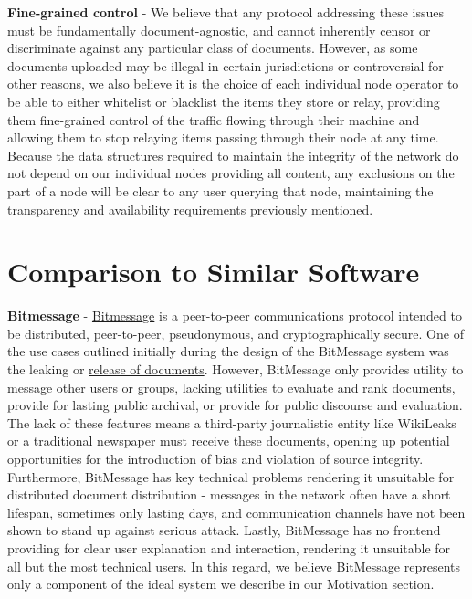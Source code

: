 \documentclass[letterpaper,10pt,oneside]{sphinxmanual}
\begin{document}
\textbf{Fine-grained control} - We believe that any protocol addressing these issues must be fundamentally document-agnostic, and
cannot inherently censor or discriminate against any particular class of documents.  However, as some documents uploaded may be
illegal in certain jurisdictions or controversial for other reasons, we also believe it is the choice of each individual node
operator to be able to either whitelist or blacklist the items they store or relay, providing them fine-grained control of the
traffic flowing through their machine and allowing them to stop relaying items passing through their node at any time.  Because
the data structures required to maintain the integrity of the network do not depend on our individual nodes providing all
content, any exclusions on the part of a node will be clear to any user querying that node, maintaining the transparency and
availability requirements previously mentioned.


\section{Comparison to Similar Software}
\label{design:comparison-to-similar-software}
\textbf{Bitmessage} - \href{http://bitmessage.org}{Bitmessage} is a peer-to-peer communications protocol intended to be distributed,
peer-to-peer, pseudonymous, and cryptographically secure.  One of the use cases outlined initially during the design of the
BitMessage system was the leaking or \href{https://bitmessage.org/forum/index.php?topic=3.0}{release of documents}.  However,
BitMessage only provides utility to message other users or groups, lacking utilities to evaluate and rank documents, provide for
lasting public archival, or provide for public discourse and evaluation.  The lack of these features means a third-party
journalistic entity like WikiLeaks or a traditional newspaper must receive these documents, opening up potential opportunities
for the introduction of bias and violation of source integrity.  Furthermore, BitMessage has key technical problems rendering it
unsuitable for distributed document distribution - messages in the network often have a short lifespan, sometimes only lasting
days, and communication channels have not been shown to stand up against serious attack.  Lastly, BitMessage has no frontend
providing for clear user explanation and interaction, rendering it unsuitable for all but the most technical users. In this
regard, we believe BitMessage represents only a component of the ideal system we describe in our Motivation section.
\end{document}
